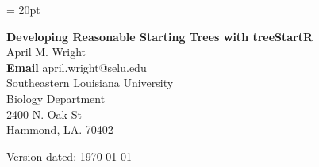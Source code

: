 \documentclass[11pt]{article}
\begin{document}
\renewcommand{\headrulewidth}{0.5pt}
\headsep = 20pt
\lhead{ }

\thispagestyle{plain}
\begin{center}

\textbf{\LARGE Developing Reasonable Starting Trees with treeStartR}\\\vspace{2mm}
\vspace{1cm}
{\Large April M. Wright} \\
{\bf Email} april.wright@selu.edu \\ %
Southeastern Louisiana University \\
Biology Department \\
2400 N. Oak St \\
Hammond, LA. 70402 \\
\vspace{1cm}
\end{center}
\newpage

\def \ResourcePath {./}
\def \GlobalResourcePath {../}




Version dated: \today
\end{document}
